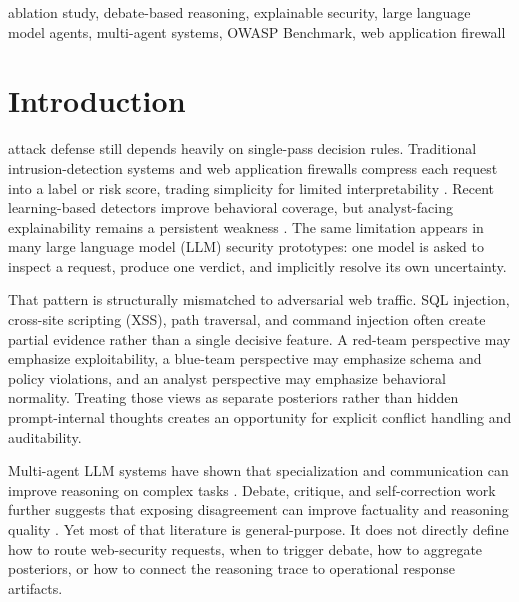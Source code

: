 \documentclass{ieeeaccess}
\begin{document}
\begin{keywords}
ablation study, debate-based reasoning, explainable security, large language model agents, multi-agent systems, OWASP Benchmark, web application firewall
\end{keywords}

\titlepgskip=-18pt
\maketitle

\section{Introduction}
 attack defense still depends heavily on single-pass decision rules. Traditional intrusion-detection systems and web application firewalls compress each request into a label or risk score, trading simplicity for limited interpretability \cite{denning1987intrusion,roesch1999snort}. Recent learning-based detectors improve behavioral coverage, but analyst-facing explainability remains a persistent weakness \cite{doriguzzi2020lucid,neupane2022xids}. The same limitation appears in many large language model (LLM) security prototypes: one model is asked to inspect a request, produce one verdict, and implicitly resolve its own uncertainty.

That pattern is structurally mismatched to adversarial web traffic. SQL injection, cross-site scripting (XSS), path traversal, and command injection often create partial evidence rather than a single decisive feature. A red-team perspective may emphasize exploitability, a blue-team perspective may emphasize schema and policy violations, and an analyst perspective may emphasize behavioral normality. Treating those views as separate posteriors rather than hidden prompt-internal thoughts creates an opportunity for explicit conflict handling and auditability.

Multi-agent LLM systems have shown that specialization and communication can improve reasoning on complex tasks \cite{wang2024autonomous,guo2024multiagentsurvey,li2023camel,wu2024autogen,hong2024metagpt,chen2024agentverse}. Debate, critique, and self-correction work further suggests that exposing disagreement can improve factuality and reasoning quality \cite{wang2023selfconsistency,du2024debate,shinn2023reflexion,huang2024selfcorrect,gou2024critic}. Yet most of that literature is general-purpose. It does not directly define how to route web-security requests, when to trigger debate, how to aggregate posteriors, or how to connect the reasoning trace to operational response artifacts.
\end{document}
